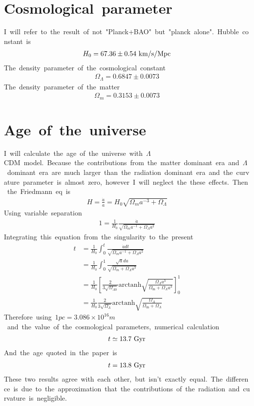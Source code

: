 \section{Cosmological\ parameter}
I\ will\ refer\ to\ the\ result\ of\ not\ "Planck+BAO"\ but\ "planck\ alone".\ Hubble\ constant\ is
\begin{align}
    H_0=67.36\pm0.54\ \rm{km/s/Mpc}
\end{align}
The\ density\ parameter\ of\ the\ cosmological\ constant
\begin{align}
    \Omega_{\Lambda}=0.6847\pm0.0073
\end{align}
The\ density\ parameter\ of\ the\ matter
\begin{align}
    \Omega_m=0.3153\pm0.0073
\end{align}

\section{Age\ of\ the\ universe}
I\ will\ calculate\ the\ age\ of\ the\ universe\ with\ $\Lambda$CDM\ model.\ Because\ the\ contributions\ from\ the\ matter\ dominant\ era\ and\ $\Lambda$\ dominant\ era\ are\ much\ larger\ than\ the\ radiation\ dominant\ era\ and\ the\ curvature\ parameter\ is\ almost\ zero,\ however\ I\ will\ neglect\ the\ these\ effects.\ Then\ the\ Friedmann\ eq\ is
\begin{align*}
    H=\frac{\Dot{a}}{a}=H_0\sqrt{\Omega_ma^{-3}+\Omega_{\Lambda}}
\end{align*}
Using\ variable\ separation
\begin{align*}
    1=\frac{1}{H_0}\frac{\Dot{a}}{\sqrt{\Omega_ma^{-1}+\Omega_{\Lambda}a^2}}
\end{align*}
Integrating\ this\ equation\ from\ the\ singularity\ to\ the\ present
\begin{align*}
    t&=\frac{1}{H_0}\int^t_0\frac{\Dot{a}dt}{\sqrt{\Omega_ma^{-1}+\Omega_{\Lambda}a^2}}\\
    &=\frac{1}{H_0}\int^1_0\frac{\sqrt{a}da}{\sqrt{\Omega_m+\Omega_{\Lambda}a^3}}\\
    &=\frac{1}{H_0}\left[\frac{2}{3\sqrt{\Omega_{\Lambda0}}}\mathrm{arctanh}\sqrt{\frac{\Omega_{\Lambda}a^3}{\Omega_{\mathrm{m}}+\Omega_{\Lambda}a^3}}\right]^1_0\\
    &=\frac{1}{H_0}\frac{2}{3\sqrt{\Omega_{\Lambda}}}\mathrm{arctanh}\sqrt{\frac{\Omega_{\Lambda}}{\Omega_{\mathrm{m}}+\Omega_{\Lambda}}}
\end{align*}
Therefore\ using\ $1pc=3.086\times10^{16}m$\ and\ the\ value\ of\ the\ cosmological\ parameters,\ numerical\ calculation
\begin{align}
    t\simeq13.7\ \rm{Gyr}
\end{align}
And\ the\ age\ quoted\ in\ the\ paper\ is
\begin{align*}
    t=13.8\ \rm{Gyr}
\end{align*}
These\ two\ results\ agree\ with\ each\ other,\ but\ isn't\ exactly\ equal.\ The\ difference\ is\ due\ to\ the\ approximation\ that\ the\ contributions\ of\ the\ radiation\ and\ curvature\ is\ negligible.

